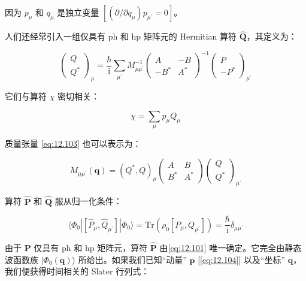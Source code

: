 因为 $p_{\mu}$ 和 $q_{\mu}$ 是独立变量 $[(\partial/\partial q_{\mu})p_{\mu^{\prime}}=0]$。

人们还经常引入一组仅具有 ph 和 hp 矩阵元的 Hermitian 算符 $\hat{\boldsymbol{Q}}$，其定义为：

\begin{equation}
\left(\begin{array}{c}
Q\\
Q^{*}
\end{array}\right)_{\mu}=\frac{\hbar}{\mathrm{i}}\sum_{\mu^{\prime}}M^{-1}_{\mu\mu^{\prime}}\left(\begin{array}{cc}
A & -B\\
-B^{*} & A^{*}
\end{array}\right)^{-1}\left(\begin{array}{c}
P\\
-P^{*}
\end{array}\right)_{\mu^{\prime}}\label{eq:12.108}
\end{equation}

它们与算符 $\chi$ 密切相关：

\begin{equation}
\chi=\sum_{\mu}p_{\mu}Q_{\mu}\label{eq:12.109}
\end{equation}

质量张量 \ref{eq:12.103} 也可以表示为：

\begin{equation}
M_{\mu\mu^{\prime}}(\boldsymbol{q})=(Q^{*},Q)_{\mu}\left(\begin{array}{cc}
A & B\\
B^{*} & A^{*}
\end{array}\right)\left(\begin{array}{c}
Q\\
Q^{*}
\end{array}\right)_{\mu^{\prime}}\label{eq:12.110}
\end{equation}

算符 $\hat{\boldsymbol{P}}$ 和 $\hat{\boldsymbol{Q}}$ 服从归一化条件：

\begin{equation}
\langle\Phi_{0}|[\hat{P}_{\mu},\hat{Q}_{\mu^{\prime}}]|\Phi_{0}\rangle=\mathrm{Tr}(\rho_{0}[P_{\mu},Q_{\mu^{\prime}}])=\frac{\hbar}{\mathrm{i}}\delta_{\mu\mu^{\prime}}\label{eq:12.111}
\end{equation}

由于 $\boldsymbol{P}$ 仅具有 ph 和 hp 矩阵元，算符 $\hat{\boldsymbol{P}}$ 由\ref{eq:12.101}
唯一确定。它完全由静态波函数族 $|\Phi_{0}(\boldsymbol{q})\rangle$ 所给出。如果我们已知“动量”
$\boldsymbol{p}$ {[}\ref{eq:12.104}{]} 以及“坐标” $\boldsymbol{q}$，我们便获得时间相关的
Slater 行列式：

